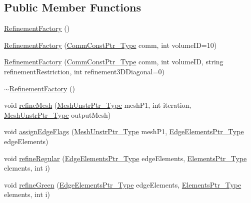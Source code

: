 \subsection*{Public Member Functions}
\begin{DoxyCompactItemize}
\item 
\hyperlink{classFEDD_1_1RefinementFactory_a45a83da1b5be5f4bcb091cf56caca25e}{Refinement\+Factory} ()
\item 
\hyperlink{classFEDD_1_1RefinementFactory_a0815e8208b193e64c26e64d94691a967}{Refinement\+Factory} (\hyperlink{classFEDD_1_1RefinementFactory_a58381e0786c65ec61d11bc73c224b45a}{Comm\+Const\+Ptr\+\_\+\+Type} comm, int volume\+ID=10)
\item 
\hyperlink{classFEDD_1_1RefinementFactory_a0abc83a680e6002dab5ee53c16f5e4f1}{Refinement\+Factory} (\hyperlink{classFEDD_1_1RefinementFactory_a58381e0786c65ec61d11bc73c224b45a}{Comm\+Const\+Ptr\+\_\+\+Type} comm, int volume\+ID, string refinement\+Restriction, int refinement3\+D\+Diagonal=0)
\item 
\hyperlink{classFEDD_1_1RefinementFactory_ae9b8ba9b12e35db03ef1b6363c1b9200}{$\sim$\+Refinement\+Factory} ()
\item 
void \hyperlink{classFEDD_1_1RefinementFactory_afeed9a01eee8623f5136e07449f3f35d}{refine\+Mesh} (\hyperlink{classFEDD_1_1RefinementFactory_a1a278d01c278972af01f2996247af8ac}{Mesh\+Unstr\+Ptr\+\_\+\+Type} mesh\+P1, int iteration, \hyperlink{classFEDD_1_1RefinementFactory_a1a278d01c278972af01f2996247af8ac}{Mesh\+Unstr\+Ptr\+\_\+\+Type} output\+Mesh)
\item 
void \hyperlink{classFEDD_1_1RefinementFactory_af0154ebdd6c904d62715d11fcd063259}{assign\+Edge\+Flags} (\hyperlink{classFEDD_1_1RefinementFactory_a1a278d01c278972af01f2996247af8ac}{Mesh\+Unstr\+Ptr\+\_\+\+Type} mesh\+P1, \hyperlink{classFEDD_1_1RefinementFactory_ae5285e990ec4632d6188a1280627ad13}{Edge\+Elements\+Ptr\+\_\+\+Type} edge\+Elements)
\item 
void \hyperlink{classFEDD_1_1RefinementFactory_a530ccd6a31c259515ab1900d544eb813}{refine\+Regular} (\hyperlink{classFEDD_1_1RefinementFactory_ae5285e990ec4632d6188a1280627ad13}{Edge\+Elements\+Ptr\+\_\+\+Type} edge\+Elements, \hyperlink{classFEDD_1_1RefinementFactory_a0994b5b7b6d080048673941251999f2e}{Elements\+Ptr\+\_\+\+Type} elements, int i)
\item 
void \hyperlink{classFEDD_1_1RefinementFactory_a130f21212d5edaad2dc8f809a2628f2a}{refine\+Green} (\hyperlink{classFEDD_1_1RefinementFactory_ae5285e990ec4632d6188a1280627ad13}{Edge\+Elements\+Ptr\+\_\+\+Type} edge\+Elements, \hyperlink{classFEDD_1_1RefinementFactory_a0994b5b7b6d080048673941251999f2e}{Elements\+Ptr\+\_\+\+Type} elements, int i)

\end{DoxyCompactItemize}
